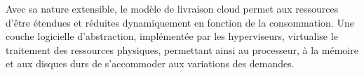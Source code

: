 Avec sa nature extensible, le modèle de livraison cloud permet aux ressources d'être étendues et réduites  dynamiquement en fonction de la consommation. Une couche logicielle d'abstraction, implémentée par les hyperviseurs, virtualise le traitement des ressources physiques,  permettant ainsi au processeur, à la mémoire et aux disques durs de s'accommoder aux variations des demandes. \cite{awsScaling} \cite{journeySDDC}







